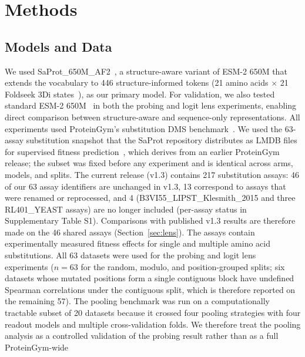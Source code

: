 \documentclass[numbered,webpdf,modern,large]{oup-authoring-template}
\newcommand{\rone}[1]{#1}
\newcommand{\rtwo}[1]{#1}
\newcommand{\rthree}[1]{#1}
\begin{document}
\section{Methods}

\subsection{Models and Data}

We used SaProt\_650M\_AF2~\cite{su2024saprot}, a structure-aware variant of ESM-2 650M
that extends the vocabulary to 446 structure-informed tokens (21 amino acids $\times$ 21
Foldseek 3Di states~\cite{vankempen2024foldseek}), as our primary model. For validation,
we also tested standard ESM-2 650M~\cite{lin2023evolutionary} in both the probing and
logit lens experiments, enabling direct comparison between structure-aware and
sequence-only representations. All experiments used ProteinGym's substitution DMS
benchmark~\cite{notin2024proteingym}. \rtwo{We used the 63-assay substitution snapshot
that the SaProt repository distributes as LMDB files for supervised fitness
prediction~\cite{su2024saprot}, which derives from an earlier ProteinGym release; the
subset was fixed before any experiment and is identical across arms, models, and
splits. The current release (v1.3) contains 217 substitution assays: 46 of our 63
assay identifiers are unchanged in v1.3, 13 correspond to assays that were renamed or
reprocessed, and 4 (B3VI55\_LIPST\_Klesmith\_2015 and three RL401\_YEAST assays) are
no longer included (per-assay status in Supplementary Table \rthree{S1}). Comparisons with
published v1.3 results are therefore made on the 46 shared assays
(Section~\ref{sec:lens}).} The assays contain experimentally measured fitness effects
for single and multiple amino acid substitutions. \rone{All 63 datasets
were used for the probing and logit lens experiments ($n = 63$ for the random, modulo, and
position-grouped splits; six datasets whose mutated positions form a single contiguous
block have undefined Spearman correlations under the contiguous split, which is therefore
reported on the remaining 57).} The pooling benchmark was run on a computationally tractable subset of
20 datasets because it crossed four pooling strategies with four readout models and
multiple cross-validation folds. We therefore treat the pooling analysis as a
controlled validation of the probing result rather than as a full ProteinGym-wide
\end{document}
